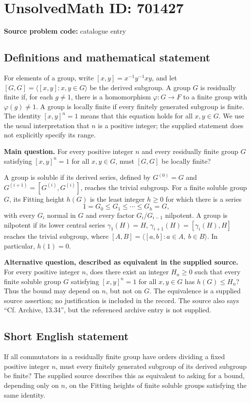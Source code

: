 \documentclass[11pt]{article}
\begin{document}
\section*{UnsolvedMath ID: 701427}
\textbf{Source problem code:} catalogue entry
\subsection{Definitions and mathematical statement}
For elements of a group, write \([x,y]=x^{-1}y^{-1}xy\), and let \([G,G]=\langle [x,y]:x,y\in G\rangle\) be the derived subgroup. A group \(G\) is residually finite if, for each \(g\ne 1\), there is a homomorphism \(\varphi:G\to F\) to a finite group with \(\varphi(g)\ne 1\). A group is locally finite if every finitely generated subgroup is finite. The identity \([x,y]^n=1\) means that this equation holds for all \(x,y\in G\). We use the usual interpretation that \(n\) is a positive integer; the supplied statement does not explicitly specify its range.

\textbf{Main question.} For every positive integer \(n\) and every residually finite group \(G\) satisfying \([x,y]^n=1\) for all \(x,y\in G\), must \([G,G]\) be locally finite?

A group is soluble if its derived series, defined by \(G^{(0)}=G\) and \(G^{(i+1)}=[G^{(i)},G^{(i)}]\), reaches the trivial subgroup. For a finite soluble group \(G\), its Fitting height \(h(G)\) is the least integer \(h\geq 0\) for which there is a series
\[
1=G_0\leq G_1\leq\cdots\leq G_h=G,
\]
with every \(G_i\) normal in \(G\) and every factor \(G_i/G_{i-1}\) nilpotent. A group is nilpotent if its lower central series \(\gamma_1(H)=H\), \(\gamma_{i+1}(H)=[\gamma_i(H),H]\) reaches the trivial subgroup, where \([A,B]=\langle[a,b]:a\in A,\ b\in B\rangle\). In particular, \(h(1)=0\).

\textbf{Alternative question, described as equivalent in the supplied source.} For every positive integer \(n\), does there exist an integer \(H_n\geq 0\) such that every finite soluble group \(G\) satisfying \([x,y]^n=1\) for all \(x,y\in G\) has \(h(G)\leq H_n\)? Thus the bound may depend on \(n\), but not on \(G\). The equivalence is a supplied source assertion; no justification is included in the record. The source also says ``Cf. Archive, 13.34'', but the referenced archive entry is not supplied.
\subsection{Short English statement}
If all commutators in a residually finite group have orders dividing a fixed positive integer \(n\), must every finitely generated subgroup of its derived subgroup be finite? The supplied source describes this as equivalent to asking for a bound, depending only on \(n\), on the Fitting heights of finite soluble groups satisfying the same identity.
\end{document}
